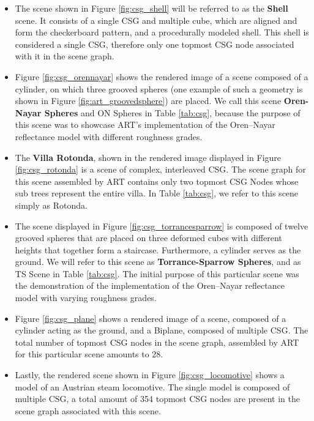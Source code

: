 \begin{itemize}
	\setlength\itemsep{0.05em}
	
	\item The scene shown in Figure \ref{fig:csg_shell} will be referred to as the \textbf{Shell} scene.
	It consists of a single CSG and multiple cube, which are aligned and form the checkerboard pattern, and a procedurally modeled shell. 
	 This shell is considered a single CSG, therefore only one topmost CSG node associated with it in the scene graph.
	
	
	\item  Figure \ref{fig:csg_orennayar} shows the rendered image of a scene composed of a cylinder, on which three grooved spheres (one example of such a geometry is shown in Figure \ref{fig:art_groovedsphere}) are placed. We call this scene \textbf{Oren-Nayar Spheres} and ON Spheres in Table \ref{tab:csg}, because the purpose of this scene was to showcase ART's implementation of the Oren–Nayar reflectance model \cite{oren1994generalization} with different roughness grades.
	
	\item The \textbf{Villa Rotonda}, shown in the rendered image displayed in Figure \ref{fig:csg_rotonda} is a scene of complex, interleaved CSG. The scene graph for this scene assembled by ART contains only two topmost CSG Nodes whose sub trees represent the entire villa.
	In Table \ref{tab:csg}, we refer to this scene simply as Rotonda.
		
	\item The scene displayed in Figure \ref{fig:csg_torrancesparrow} is composed of twelve grooved spheres that are placed on three deformed cubes with different heights that together form a staircase. Furthermore, a cylinder serves as the ground. We will refer to this scene as \textbf{Torrance-Sparrow Spheres}, and as TS Scene in Table \ref{tab:csg}. The initial purpose of this particular scene was the demonstration of the implementation of the Oren–Nayar reflectance model \cite{torrance1967theory} with varying roughness grades.
	
	\item Figure \ref{fig:csg_plane} shows a rendered image of a scene, composed of a cylinder acting as the ground, and a Biplane, composed of multiple CSG. The total number of topmost CSG nodes in the scene graph, assembled by ART for this particular scene amounts to 28.
	
	\item Lastly, the rendered scene shown in Figure \ref{fig:csg_locomotive} shows a model of an Austrian steam locomotive. The single model is composed of multiple CSG, a total amount of 354 topmost CSG nodes are present in the scene graph associated with this scene.
	
	
\end{itemize}

